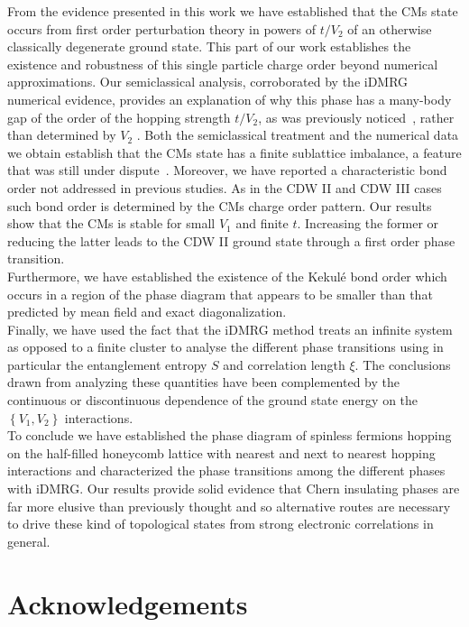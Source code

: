 \documentclass[aps,prx,10pt,twocolumn,floatfix,superscriptaddress,showpacs,numerical,footinbib]{revtex4-1}
\begin{document}
From the evidence presented in this work we have established that the CMs state occurs from first
order perturbation theory in powers of $t/V_{2}$ of an otherwise classically degenerate ground state.
%
This part of our work establishes the existence and robustness 
of this single particle charge order beyond numerical approximations.
%
Our semiclassical analysis, corroborated by the iDMRG numerical evidence,
provides an explanation of why this phase has a many-body gap of the order of the hopping strength $t/V_{2}$,
as was previously noticed~\cite{DH14,DCH14}, rather than determined by $V_{2}$ .
%
Both the semiclassical treatment and the numerical data we obtain establish that the CMs state
has a finite sublattice imbalance, a feature that was still under dispute~\cite{GCC13,DH14}.
%
Moreover, we have reported a characteristic bond order not addressed in previous studies.
%
As in the CDW II and CDW III cases such bond order is determined by the CMs charge order pattern.
%
Our results show that the CMs is stable for small $V_{1}$ and finite $t$.
% 
Increasing the former or reducing the latter leads to the CDW II ground state through a first order phase transition.\\
%
Furthermore, we have established the existence of the Kekul\'{e} bond order which occurs in a region of the phase 
diagram that appears to be smaller than that predicted by mean field and exact diagonalization.\\
%
Finally, we have used the fact that the iDMRG method treats an infinite system as opposed to a finite cluster to analyse 
the different phase transitions using in particular the entanglement entropy $S$ and correlation length $\xi$.
%
The conclusions drawn from analyzing these quantities have been complemented by the continuous 
or discontinuous dependence of the ground state energy on the $\left\lbrace V_{1},V_{2}\right\rbrace$ interactions.\\
%

To conclude we have established the phase diagram of spinless fermions hopping on the half-filled honeycomb lattice
with nearest and next to nearest hopping interactions and characterized the phase transitions among the different phases with iDMRG.
%
Our results provide solid evidence that Chern insulating phases are far more elusive than previously thought and
so alternative routes are necessary to drive these kind of topological states from strong electronic correlations in general.
%
\section{Acknowledgements}
\end{document}
